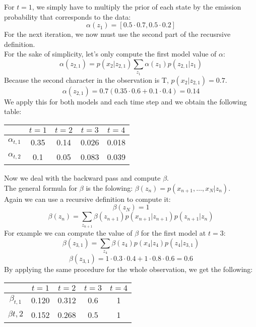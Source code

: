 \documentclass[a4paper, 10pt]{article}
\begin{document}
For $t=1$, we simply have to multiply the prior of each state by the emission probability
that corresponds to the data:
$$
\alpha(z_1) = \left[0.5\cdot 0.7, 0.5\cdot 0.2\right] 
$$
For the next iteration, we now must use the second part of the recusrsive definition.
\\
For the sake of simplicity, let's only compute the first model value of $\alpha$:
$$
\alpha(z_{2,1}) = p(x_2\vert z_{2,1}) \sum_{z_1} \alpha(z_1)p(z_{2,1}\vert z_1) 
$$
Because the second character in the observation is T, $p(x_2\vert z_{2,1}) = 0.7$.
$$
\alpha(z_{2,1}) = 0.7 (0.35 \cdot 0.6 + 0.1 \cdot 0.4) = 0.14
$$
We apply this for both models and each time step and we obtain the following table:
\begin{center}
    \begin{tabular}{ |c|c|c|c|c| }
        \hline
         & $t=1$ & $t=2$ & $t=3$ & $t=4$ \\
        \hline
        $\alpha_{t,1}$ & 0.35 & 0.14 & 0.026 & 0.018 \\
        \hline
        $\alpha_{t,2}$ & 0.1 & 0.05 & 0.083 & 0.039\\
        \hline
    \end{tabular}
\end{center}

Now we deal with the backward pass and compute $\beta$.
\\
The general formula for $\beta$ is the folowing:
$\beta(z_n) = p(x_{n+1}, \dots, x_N \vert z_n)$.
\\
Again we can use a recursive definition to compute it:
$$
\beta(z_N) = 1
$$
$$
\beta(z_n) = \sum_{z_{n+1}} \beta(z_{n+1})p(x_{n+1}\vert z_{n+1})p(z_{n+1}\vert z_n)
$$
For example we can compute the value of $\beta$ for the first model at $t=3$:
$$
\beta(z_{3,1}) = \sum_{z_4} \beta(z_4)p(x_4\vert z_4)p(z_4\vert z_{3,1})
$$
$$
\beta(z_{3,1}) = 1\cdot 0.3 \cdot 0.4 + 1\cdot 0.8 \cdot 0.6 = 0.6
$$
By applying the same procedure for the whole observation, we get the following:
\begin{center}
    \begin{tabular}{ |c|c|c|c|c| }
        \hline
         & $t=1$ & $t=2$ & $t=3$ & $t=4$ \\
        \hline
        $\beta_{t,1}$ & 0.120 & 0.312 & 0.6 & 1 \\
        \hline
        $\beta{t,2}$ & 0.152 & 0.268 & 0.5 & 1\\
        \hline
    \end{tabular}
\end{center}
\end{document}
